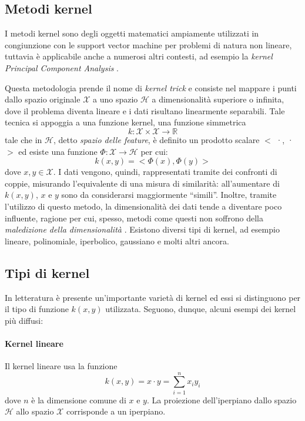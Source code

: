 \documentclass[12pt]{report}
\theoremstyle{definition}
\begin{document}
\subsection{Metodi kernel} \label{kernel}
I metodi kernel sono degli oggetti matematici ampiamente utilizzati in congiunzione con le support vector machine \cite{28} per problemi di natura non lineare, tuttavia è applicabile anche a numerosi altri contesti, ad esempio la \textit{kernel Principal Component Analysis} \cite{29}.

Questa metodologia prende il nome di \textit{kernel trick} e consiste nel mappare i punti dallo spazio originale $\mathcal X$ a uno spazio $\mathcal H$ a dimensionalità superiore o infinita, dove il problema diventa lineare e i dati risultano linearmente separabili.
Tale tecnica si appoggia a una funzione kernel, una funzione simmetrica 
\begin{equation}
    k: \mathcal{X} \times \mathcal{X} \rightarrow \mathbb{R}
\end{equation} 
tale che in $\mathcal{H}$, detto \textit{spazio delle feature}, è definito un prodotto scalare $<$ ·, · $>$ ed esiste una funzione $\mathit{\Phi }: \mathcal{X} \rightarrow \mathcal{H}$ per cui:
\begin{equation}
    k(x,y) = <\mathit{\Phi}(x), \mathit{\Phi}(y)>
\end{equation}
dove $x,y \in \mathcal{X}$.
I dati vengono, quindi, rappresentati tramite dei confronti di coppie, misurando l'equivalente di una misura di similarità: all'aumentare di $k(x,y)$, $x$ e $y$ sono da considerarsi maggiormente  ``simili''.
Inoltre, tramite l'utilizzo di questo metodo, la dimensionalità dei dati tende a diventare poco influente, ragione per cui, spesso, metodi come questi non soffrono della \textit{maledizione della dimensionalità} \cite{39}.
Esistono diversi tipi di kernel, ad esempio lineare, polinomiale, iperbolico, gaussiano e molti altri ancora.

\subsection{Tipi di kernel}
In letteratura è presente un'importante varietà di kernel ed essi si distinguono per il tipo di funzione $k(x,y)$ utilizzata. Seguono, dunque, alcuni esempi dei kernel più diffusi:

\paragraph{Kernel lineare}
Il kernel lineare usa la funzione
\begin{equation}
    k(x,y) = x \cdot y = \sum\limits_{i=1}^n x_iy_i
\end{equation}
dove $n$ è la dimensione comune di $x$ e $y$.
La proiezione dell'iperpiano dallo spazio $\mathcal{H}$ allo spazio $\mathcal{X}$ corrisponde a un iperpiano.
\end{document}
